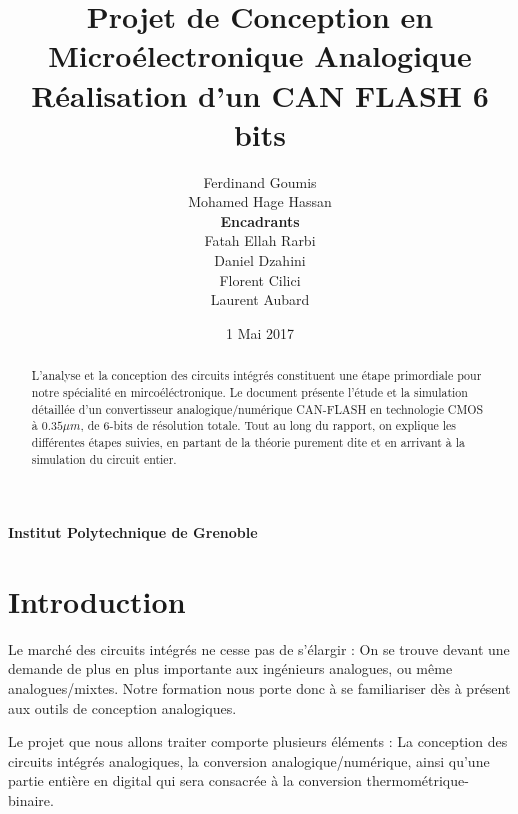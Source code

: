 \documentclass[11pt]{article}
\begin{document}
\title{\textbf{Projet de Conception en Micro\'electronique Analogique} \\ R\'ealisation d'un CAN FLASH 6 bits}
\author{Ferdinand Goumis \\ Mohamed Hage Hassan \medskip\\\medskip \textbf{Encadrants} \medskip \\ Fatah Ellah Rarbi \\ Daniel Dzahini \\ Florent Cilici \\ Laurent Aubard}
\date{1 Mai 2017}
\maketitle
\thispagestyle{empty}

\renewcommand{\abstractname}{Pr\'emabule}

\begin{abstract}
L'analyse et la conception des circuits int\'egr\'es constituent une \'etape primordiale pour notre sp\'ecialit\'e en mirco\'el\'ectronique. Le document pr\'esente l'\'etude et la simulation d\'etaill\'ee d'un convertisseur analogique/num\'erique CAN-FLASH en technologie CMOS \`a $0.35 \mu m$, de 6-bits de r\'esolution totale. Tout au long du rapport, on explique les diff\'erentes \'etapes suivies, en partant de la th\'eorie purement dite et en arrivant \`a la simulation du circuit entier.
  
\end{abstract}

\vskip 9.5cm
\begin{center} \textbf{Institut Polytechnique de Grenoble} \end{center}

\clearpage

\tableofcontents
\clearpage

\section{Introduction}

Le march\'e des circuits int\'egr\'es ne cesse pas de s'\'elargir : On se trouve devant une demande de plus en plus importante aux ing\'enieurs analogues, ou m\^eme analogues/mixtes. Notre formation nous porte donc \`a se familiariser d\`es \`a pr\'esent aux outils de conception analogiques. 

Le projet que nous allons traiter comporte plusieurs \'el\'ements : La conception des circuits int\'egr\'es analogiques, la conversion analogique/num\'erique, ainsi qu'une partie enti\`ere en digital qui sera consacr\'ee \`a la conversion thermom\'etrique-binaire.
\end{document}
